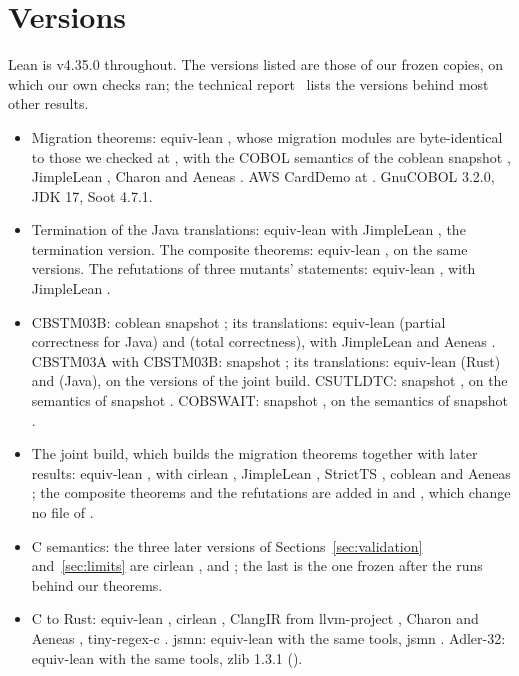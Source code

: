 \section{Versions}
\label{app:pins}

Lean is v4.35.0 throughout. The versions listed are those of our frozen copies, on which our own checks ran; the technical report~\cite{fvtechreport} lists the versions behind most other results.

\begin{itemize}
\item Migration theorems: equiv-lean , whose migration modules are byte-identical to those we checked at
, with the COBOL semantics of the coblean snapshot , JimpleLean
, Charon  and Aeneas . AWS CardDemo at . GnuCOBOL
3.2.0, JDK 17, Soot 4.7.1.
\item Termination of the Java translations: equiv-lean  with JimpleLean , the
termination version. The composite theorems: equiv-lean , on the same versions. The refutations of three
mutants' statements: equiv-lean , with JimpleLean .
\item CBSTM03B: coblean snapshot ; its translations: equiv-lean 
(partial correctness for Java) and  (total correctness), with JimpleLean  and Aeneas
. CBSTM03A with CBSTM03B: snapshot ; its translations: equiv-lean
 (Rust) and  (Java), on the versions of the joint build. CSUTLDTC: snapshot
, on the semantics of snapshot . COBSWAIT: snapshot
, on the semantics of snapshot .
\item The joint build, which builds the migration theorems together with later results: equiv-lean , with cirlean , JimpleLean , StrictTS
, coblean  and Aeneas ; the composite theorems and the refutations are
added in  and , which change no file of .
\item C semantics: the three later versions of Sections~\ref{sec:validation} and~\ref{sec:limits} are cirlean
,  and ; the last is the one frozen after the runs behind our theorems.
\item C to Rust: equiv-lean , cirlean , ClangIR from llvm-project , Charon
 and Aeneas , tiny-regex-c . jsmn: equiv-lean  with the same
tools, jsmn . Adler-32: equiv-lean  with the same tools, zlib 1.3.1 ().
\end{itemize}

